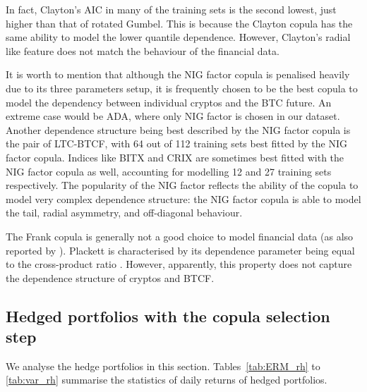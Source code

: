 In fact, Clayton's AIC in many of the training sets is the second lowest, just higher than that of rotated Gumbel.
This is because the Clayton copula has the same ability to model the lower quantile dependence.
However, Clayton's radial like feature does not match the behaviour of
the financial data. \medskip

It is worth to mention that although the NIG factor copula is penalised heavily due to its three parameters setup,
it is frequently chosen to be the best copula to model the dependency
between individual cryptos and the BTC future.
An extreme case would be ADA, where only NIG factor is chosen in our dataset.
Another dependence structure being best described by the NIG factor
copula is the pair of LTC-BTCF, with
64 out of 112 training sets best fitted by the NIG factor copula.
Indices like BITX and CRIX are sometimes best fitted with the NIG
factor copula as well, accounting for modelling 12 and 27 training
sets respectively.
The popularity of the NIG factor reflects the ability of the copula to
model very complex dependence structure: the
NIG factor copula is able to model the tail, radial asymmetry, and
off-diagonal behaviour.  \medskip

The Frank copula is generally not a good choice to model financial
data (as also reported by \cite{barbi2014copula}).
Plackett is characterised by its dependence parameter being equal to
the cross-product ratio %
. 
However, apparently, this property does not capture the dependence
structure of cryptos and BTCF.


\subsection{Hedged portfolios with the copula selection step}\label{subsec:HP2}
\begin{table}[t] \centering

\end{table}
We analyse the hedge portfolios in this section. 
Tables~\ref{tab:ERM_rh} to \ref{tab:var_rh} summarise the statistics
of daily returns of hedged portfolios.

